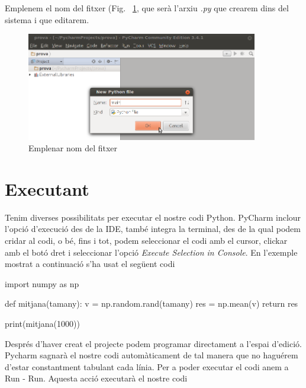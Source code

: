 Emplenem el nom del fitxer (Fig. ~\ref{fig:main}, que serà l'arxiu \emph{.py} que crearem dins del sistema i que editarem.


\begin{figure}[!h]
    \begin{centering}
    \includegraphics[width=0.9\textwidth]{img/main.png}
    \caption{Emplenar nom del fitxer}
    \label{fig:main}
    \end{centering}
\end{figure}





\section{Executant}


Tenim diverses possibilitats per executar el nostre codi Python. PyCharm inclour l'opció d'execució des de la IDE, també integra la terminal, des de la qual podem cridar al codi, o bé, fins i tot, podem seleccionar el codi amb el cursor, clickar amb el botó dret i seleccionar l'opció \emph{Execute Selection in Console}. En l'exemple mostrat a continuació s'ha usat el següent codi



\begin{blockcode}
import numpy as np

def mitjana(tamany):
    v = np.random.rand(tamany)
    res = np.mean(v)
    return res

print(mitjana(1000))
\end{blockcode}

Després d'haver creat el projecte podem programar directament a l'espai d'edició. Pycharm sagnarà el nostre codi automàticament de tal manera que no haguérem d'estar constantment tabulant cada línia. Per a poder executar el codi anem a Run - Run. Aquesta acció executarà el nostre codi



